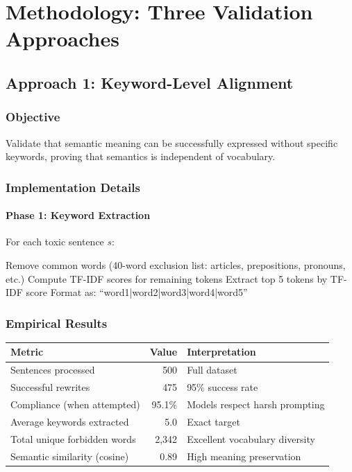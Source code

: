 \documentclass[12pt,a4paper,oneside]{report}
\begin{document}
\clearpage
\chapter{Methodology: Three Validation Approaches}

\section{Approach 1: Keyword-Level Alignment}

\subsection{Objective}

Validate that semantic meaning can be successfully expressed without specific keywords, proving that semantics is independent of vocabulary.

\subsection{Implementation Details}

\subsubsection{Phase 1: Keyword Extraction}

For each toxic sentence $s$:

\begin{algorithm}
\caption{Keyword Extraction}
\begin{algorithmic}
\State Remove common words (40-word exclusion list: articles, prepositions, pronouns, etc.)
\State Compute TF-IDF scores for remaining tokens
\State Extract top 5 tokens by TF-IDF score
\State Format as: ``word1|word2|word3|word4|word5''
\end{algorithmic}
\end{algorithm}

\subsection{Empirical Results}

\begin{table}[H]
\centering
\begin{tabular}{|l|r|p{5cm}|}
\hline
\textbf{Metric} & \textbf{Value} & \textbf{Interpretation} \\
\hline
Sentences processed & 500 & Full dataset \\
\hline
Successful rewrites & 475 & 95\% success rate \\
\hline
Compliance (when attempted) & 95.1\% & Models respect harsh prompting \\
\hline
Average keywords extracted & 5.0 & Exact target \\
\hline
Total unique forbidden words & 2,342 & Excellent vocabulary diversity \\
\hline
Semantic similarity (cosine) & 0.89 & High meaning preservation \\
\hline
\end{tabular}
\end{table}
\end{document}
